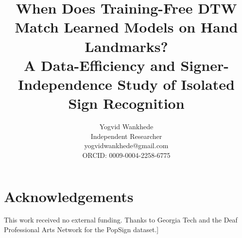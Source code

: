 \documentclass[11pt]{article}
\title{When Does Training-Free DTW Match Learned Models on Hand Landmarks?\\
A Data-Efficiency and Signer-Independence Study of Isolated Sign Recognition}
\author{Yogvid Wankhede \\
  Independent Researcher \\
  yogvidwankhede@gmail.com \\
  ORCID: 0009-0004-2258-6775}
\begin{document}
\maketitle











\section*{Acknowledgements}
This work received no external funding. Thanks to Georgia Tech and the Deaf Professional Arts Network for the PopSign dataset.]


\end{document}
